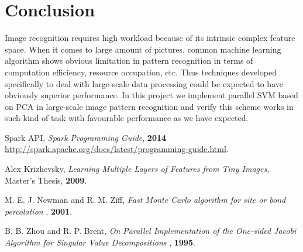 \documentclass[a4paper]{article}
\begin{document}
\section{Conclusion}
Image recognition requires high workload because of its intrinsic complex feature space. When it comes to large amount of pictures, common machine learning algorithm shows obvious limitation in pattern recognition in terms of computation efficiency, resource occupation, etc. Thus techniques developed specifically to deal with large-scale data processing could be expected to have obviously superior performance. In this project we implement parallel SVM based on PCA in large-scale image pattern recognition and verify this scheme works in such kind of task with favourable performance as we have expected. 


\begin{thebibliography}{}

 Spark API, \emph{Spark Programming Guide}, \textbf{2014} 
\url{http://spark.apache.org/docs/latest/programming-guide.html}.

 Alex Krizhevsky, \emph{Learning Multiple Layers of Features from Tiny Images}, Master's Thesis, \textbf{2009}.

 M. E. J. Newman and R. M. Ziff, \emph{Fast Monte Carlo algorithm for site or bond percolation
}, \textbf{2001}.

 B. B. Zhou and R. P. Brent, \emph{On Parallel Implementation of the One-sided Jacobi Algorithm for Singular Value Decompositions
}, \textbf{1995}.

\end{thebibliography}
\end{document}
